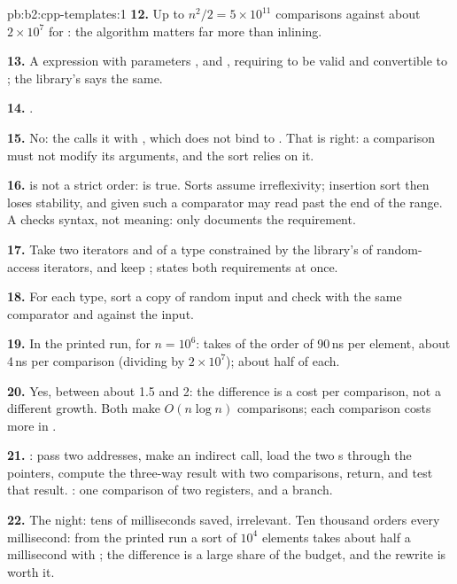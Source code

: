 \begin{solution}{pb:b2:cpp-templates:1}
\textbf{12.} Up to $n^2 / 2 = 5 \times 10^{11}$ comparisons against about $2 \times 10^7$ for : the
algorithm matters far more than inlining.

\textbf{13.} A  expression with parameters ,  and
, requiring  to be valid and convertible to ; the library's
 says the same.

\textbf{14.} .

\textbf{15.} No: the  calls it with , which does not bind to . That is right: a
comparison must not modify its arguments, and the sort relies on it.

\textbf{16.} \code{<=} is not a strict order:  is true. Sorts assume irreflexivity; insertion sort then
loses stability, and  given such a comparator may read past the end of the range. A  checks
syntax, not meaning:  only documents the requirement.

\textbf{17.} Take two iterators  and  of a type  constrained by the
library's  of random-access iterators, and keep ;  states both
requirements at once.

\textbf{18.} For each type, sort a copy of random input and check  with the same comparator and
 against the input.

\textbf{19.} In the printed run, for $n = 10^6$:  takes of the order of 90\,ns per element, about 4\,ns
per comparison (dividing by $2 \times 10^7$);  about half of each.

\textbf{20.} Yes, between about 1.5 and 2: the difference is a cost per comparison, not a different growth. Both make
$O(n \log n)$ comparisons; each comparison costs more in .

\textbf{21.} : pass two addresses, make an indirect call, load the two s through the pointers,
compute the three-way result with two comparisons, return, and test that result. : one comparison of
two registers, and a branch.

\textbf{22.} The night: tens of milliseconds saved, irrelevant. Ten thousand orders every millisecond: from the
printed run a sort of $10^4$ elements takes about half a millisecond with ; the difference is a large
share of the budget, and the rewrite is worth it.


\end{solution}
